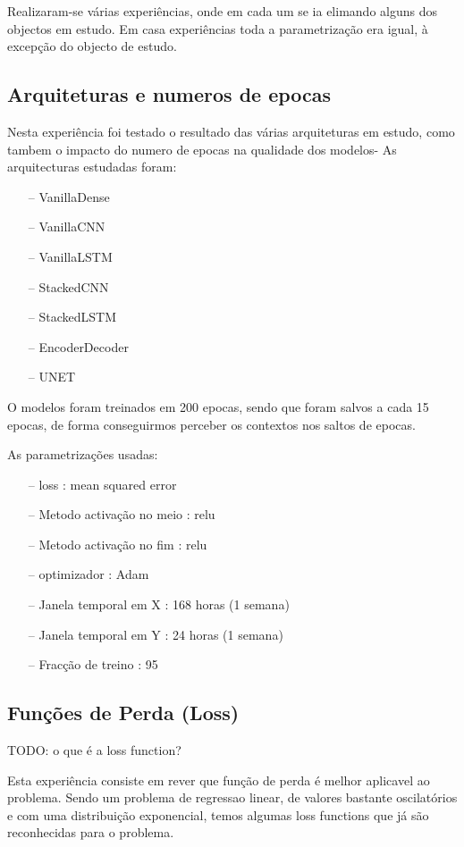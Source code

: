 Realizaram-se várias experiências, onde em cada um se ia elimando alguns dos objectos em estudo.
Em casa experiências toda a parametrização era igual, à excepção do objecto de estudo.

\subsection{Arquiteturas e numeros de epocas}

Nesta experiência foi testado o resultado das várias arquiteturas em estudo, como tambem o impacto do numero de epocas na qualidade dos modelos-
As arquitecturas estudadas foram:

\begin{itemize}
    \item[--] VanillaDense
    \item[--] VanillaCNN
    \item[--] VanillaLSTM
    \item[--] StackedCNN
    \item[--] StackedLSTM
    \item[--] EncoderDecoder
    \item[--] UNET
\end{itemize}

O modelos foram treinados em 200 epocas, sendo que foram salvos a cada 15 epocas, de forma conseguirmos perceber os contextos nos saltos de epocas.

As parametrizações usadas:
\begin{itemize}
    \item[--] loss : mean squared error
    \item[--] Metodo activação no meio : relu
    \item[--] Metodo activação no fim : relu
    \item[--] optimizador : Adam
    \item[--] Janela temporal em X : 168 horas (1 semana)
    \item[--] Janela temporal em Y : 24 horas (1 semana)
    \item[--] Fracção de treino : 95%
\end{itemize}

\subsection{Funções de Perda (Loss)}

TODO: o que é a loss function?

Esta experiência consiste em rever que função de perda é melhor aplicavel ao problema. Sendo um problema de regressao linear, de valores bastante oscilatórios e com uma distribuição exponencial, temos algumas loss functions que já são reconhecidas para o problema.

